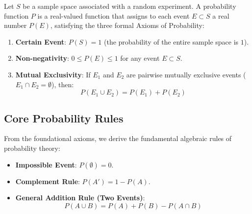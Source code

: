 \begin{definition}
    Let $S$ be a sample space associated with a random experiment.
    A probability function $P$ is a real-valued function that assigns to each event $E \subset S$ a real number $P(E)$,
    satisfying the three formal Axioms of Probability:

    \begin{enumerate}\setlength\itemsep{1em}
        \item[\textbf{(A1)}] \textbf{Certain Event}: $P(S) = 1$ (the probability of the entire sample space is $1$).
        \item[\textbf{(A2)}] \textbf{Non-negativity}: $0 \le P(E) \le 1$ for any event $E \subset S$.
        \item[\textbf{(A3)}] \textbf{Mutual Exclusivity}: If $E_1$ and $E_2$ are pairwise mutually exclusive events ($E_1 \cap E_2 = \emptyset$), then:
        \[
            P(E_1 \cup E_2) = P(E_1) + P(E_2)
        \]
    \end{enumerate}
\end{definition}

\subsection*{Core Probability Rules}

From the foundational axioms, we derive the fundamental algebraic rules of probability theory:

\begin{itemize}\setlength\itemsep{1em}
    \item[\textbf{(R1)}] \textbf{Impossible Event}: $P(\emptyset) = 0$.
    \item[\textbf{(R2)}] \textbf{Complement Rule}: $P(A') = 1 - P(A)$.
    \item[\textbf{(R3.1)}] \textbf{General Addition Rule (Two Events)}: 
    \[
        P(A \cup B) = P(A) + P(B) - P(A \cap B)
    \]
\end{itemize}

\begin{center}
    \label{fig:probability-rules}
\end{center}

